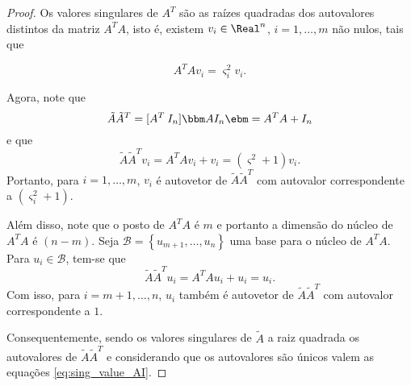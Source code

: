 \begin{proof}
Os valores singulares de $A^T$ são as raízes quadradas dos autovalores
distintos da matriz $A^TA$, isto é, existem $v_i\in \Real^n$, $i=1,\ldots,m$ não
nulos, tais que

\[
A^TAv_i = \varsigma^2_iv_i.
\]

Agora, note que
\[\tilde{A}\tilde{A}^T = [A^T \: I_n ]\bbm A\\ I_n \ebm = A^TA +
I_n
\]
e que
\[
\tilde{A}\tilde{A}^Tv_i = A^TAv_i + v_i = (\varsigma^2 + 1)v_i.
\]
Portanto, para $i=1,\ldots,m$,  $v_i$  é autovetor de
$\tilde{A}\tilde{A}^T$ com autovalor correspondente a $(\varsigma_i^2 + 1)$.

Além disso, note que o posto de $A^TA$ é $m$ e portanto
a dimensão do núcleo de $A^TA$ é $(n-m)$. Seja $\mathcal{B} =
\left\{ u_{m+1},\ldots,u_n\right\} $ uma base para o núcleo de $A^TA$. Para
$u_i\in\mathcal{B}$, tem-se que
\[
\tilde{A}\tilde{A}^Tu_i = A^TAu_i + u_i = u_i.
\]
Com isso, para $i=m+1,\ldots,n$,  $u_i$ também é autovetor de
$\tilde{A}\tilde{A}^T$ com autovalor correspondente a $1$.


Consequentemente, sendo os valores singulares de $\tilde{A}$ a raiz quadrada os
autovalores de $\tilde{A}\tilde{A}^T$  e considerando que os autovalores são
únicos valem as equações \eqref{eq:sing_value_AI}.
\end{proof}




